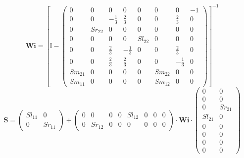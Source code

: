 \begin{equation} \mathbf{Wi} =  \left[ \mathbb{I}  -
\left(\begin{smallmatrix} 0 & 0 & 0 & 0 & 0 & 0 & 0 & -1 \\ 0 & 0 &
-\frac{1}{3} & \frac{2}{3} & 0 & 0 & \frac{2}{3} & 0 \\ 0 & Sr_{22} &
0 & 0 & 0 & 0 & 0 & 0 \\ 0 & 0 & 0 & 0 & Sl_{22} & 0 & 0 & 0 \\ 0 & 0
& \frac{2}{3} & -\frac{1}{3} & 0 & 0 & \frac{2}{3} & 0 \\ 0 & 0 &
\frac{2}{3} & \frac{2}{3} & 0 & 0 & -\frac{1}{3} & 0 \\ Sm_{21} & 0 &
0 & 0 & 0 & Sm_{22} & 0 & 0 \\ Sm_{11} & 0 & 0 & 0 & 0 & Sm_{12} & 0 &
0 \end{smallmatrix}\right) \right]^{-1}  \end{equation}
\begin{equation} \mathbf{S} = \left(\begin{smallmatrix} Sl_{11} & 0 \\
0 & Sr_{11} \end{smallmatrix}\right) + \left(\begin{smallmatrix} 0 & 0
& 0 & 0 & Sl_{12} & 0 & 0 & 0 \\ 0 & Sr_{12} & 0 & 0 & 0 & 0 & 0 & 0
\end{smallmatrix}\right) \cdot \mathbf{Wi}
\cdot\left(\begin{smallmatrix} 0 & 0 \\ 0 & 0 \\ 0 & Sr_{21} \\
Sl_{21} & 0 \\ 0 & 0 \\ 0 & 0 \\ 0 & 0 \\ 0 & 0
\end{smallmatrix}\right) \end{equation}
